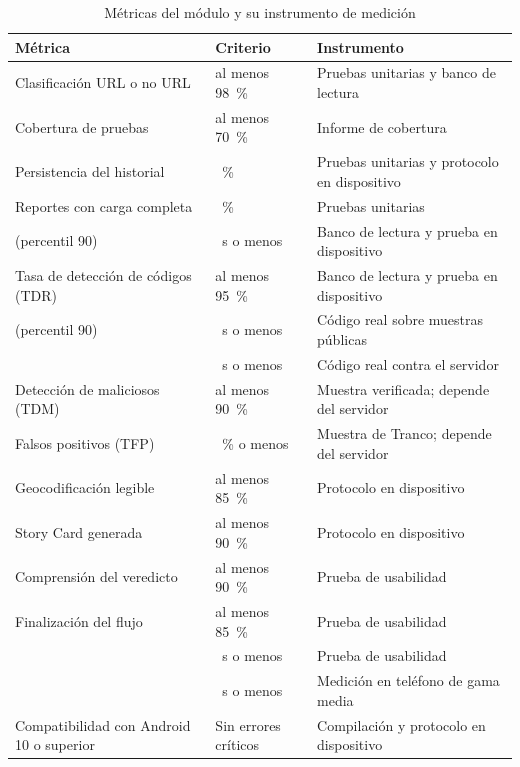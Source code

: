 \begin{table}[H]
	\centering
	\caption{Métricas del módulo y su instrumento de medición}
	\label{tab:metricas}
	\small
	\begin{tabular}{@{}>{\raggedright\arraybackslash}p{4.6cm}>{\raggedright\arraybackslash}p{2.6cm}>{\raggedright\arraybackslash}p{5.6cm}@{}}
		\toprule
		\textbf{Métrica} & \textbf{Criterio} & \textbf{Instrumento} \\
		\midrule
		Clasificación URL o no URL & al menos 98~\% & Pruebas unitarias y banco de lectura \\
		Cobertura de pruebas & al menos 70~\% & Informe de cobertura \\
		Persistencia del historial & 100~\% & Pruebas unitarias y protocolo en dispositivo \\
		Reportes con carga completa & 100~\% & Pruebas unitarias \\
		\tscan{} (percentil 90) & 5~s o menos & Banco de lectura y prueba en dispositivo \\
		Tasa de detección de códigos (TDR) & al menos 95~\% & Banco de lectura y prueba en dispositivo \\
		\tfuno{} (percentil 90) & 5~s o menos & Código real sobre muestras públicas \\
		\ttotal{} & 35~s o menos & Código real contra el servidor \\
		Detección de maliciosos (TDM) & al menos 90~\% & Muestra verificada; depende del servidor \\
		Falsos positivos (TFP) & 5~\% o menos & Muestra de Tranco; depende del servidor \\
		Geocodificación legible & al menos 85~\% & Protocolo en dispositivo \\
		Story Card generada & al menos 90~\% & Protocolo en dispositivo \\
		Comprensión del veredicto & al menos 90~\% & Prueba de usabilidad \\
		Finalización del flujo & al menos 85~\% & Prueba de usabilidad \\
		\tlearn & 60~s o menos & Prueba de usabilidad \\
		\tstart & 3~s o menos & Medición en teléfono de gama media \\
		Compatibilidad con Android 10 o superior & Sin errores críticos & Compilación y protocolo en dispositivo \\
		\bottomrule
	\end{tabular}
\end{table}


